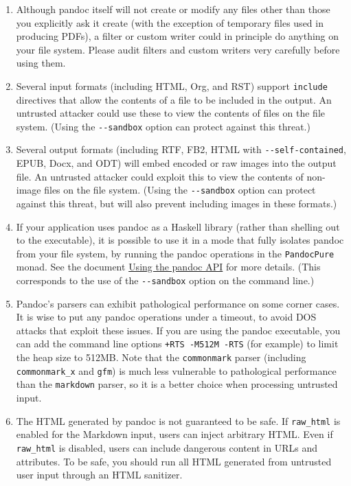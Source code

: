 \documentclass[
  b5paper
]{book}
\begin{document}
\begin{enumerate}
\def\labelenumi{\arabic{enumi}.}
\item
  Although pandoc itself will not create or modify any files other than
  those you explicitly ask it create (with the exception of temporary
  files used in producing PDFs), a filter or custom writer could in
  principle do anything on your file system. Please audit filters and
  custom writers very carefully before using them.
\item
  Several input formats (including HTML, Org, and RST) support
  \texttt{include} directives that allow the contents of a file to be
  included in the output. An untrusted attacker could use these to view
  the contents of files on the file system. (Using the
  \texttt{-\/-sandbox} option can protect against this threat.)
\item
  Several output formats (including RTF, FB2, HTML with
  \texttt{-\/-self-contained}, EPUB, Docx, and ODT) will embed encoded
  or raw images into the output file. An untrusted attacker could
  exploit this to view the contents of non-image files on the file
  system. (Using the \texttt{-\/-sandbox} option can protect against
  this threat, but will also prevent including images in these formats.)
\item
  If your application uses pandoc as a Haskell library (rather than
  shelling out to the executable), it is possible to use it in a mode
  that fully isolates pandoc from your file system, by running the
  pandoc operations in the \texttt{PandocPure} monad. See the document
  \href{https://pandoc.org/using-the-pandoc-api.html}{Using the pandoc
  API} for more details. (This corresponds to the use of the
  \texttt{-\/-sandbox} option on the command line.)
\item
  Pandoc's parsers can exhibit pathological performance on some corner
  cases. It is wise to put any pandoc operations under a timeout, to
  avoid DOS attacks that exploit these issues. If you are using the
  pandoc executable, you can add the command line options
  \texttt{+RTS\ -M512M\ -RTS} (for example) to limit the heap size to
  512MB. Note that the \texttt{commonmark} parser (including
  \texttt{commonmark\_x} and \texttt{gfm}) is much less vulnerable to
  pathological performance than the \texttt{markdown} parser, so it is a
  better choice when processing untrusted input.
\item
  The HTML generated by pandoc is not guaranteed to be safe. If
  \texttt{raw\_html} is enabled for the Markdown input, users can inject
  arbitrary HTML. Even if \texttt{raw\_html} is disabled, users can
  include dangerous content in URLs and attributes. To be safe, you
  should run all HTML generated from untrusted user input through an
  HTML sanitizer.
\end{enumerate}
\end{document}
